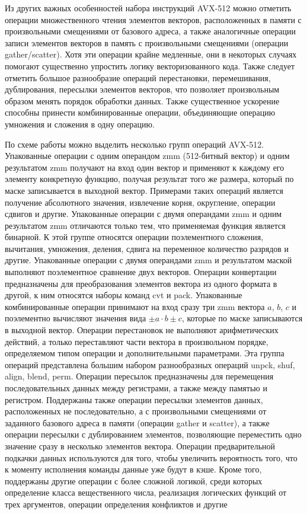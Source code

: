 Из других важных особенностей набора инструкций AVX-512 можно отметить операции множественного чтения элементов векторов, расположенных в памяти с произвольными смещениями от базового адреса, а также аналогичные операции записи элементов векторов в память с произвольными смещениями (операции gather/scatter).
Хотя эти операции крайне медленные, они в некоторых случаях помогают существенно упростить логику векторизованного кода.
Также следует отметить большое разнообразие операций перестановки, перемешивания, дублирования, пересылки элементов векторов, что позволяет произвольным образом менять порядок обработки данных.
Также существенное ускорение способны принести комбинированные операции, объединяющие операцию умножения и сложения в одну операцию.

По схеме работы можно выделить несколько групп операций AVX-512.
Упакованные операции с одним операндом zmm (512-битный вектор) и одним результатом zmm получают на вход один вектор и применяют к каждому его элементу конкретную функцию, получая результат того же размера, который по маске записывается в выходной вектор.
Примерами таких операций является получение абсолютного значения, извлечение корня, округление, операции сдвигов и другие.
Упакованные операции с двумя операндами zmm и одним результатом zmm отличаются только тем, что применяемая функция является бинарной.
К этой группе относятся операции поэлементного сложения, вычитания, умножения, деления, сдвига на переменное количество разрядов и другие.
Упакованные операции с двумя операндами zmm и результатом маской выполняют поэлементное сравнение двух векторов.
Операции конвертации предназначены для преобразования элементов вектора из одного формата в другой, к ним относятся наборы команд cvt и pack.
Упакованные комбинированные операции принимают на вход сразу три zmm вектора $a$, $b$, $c$ и поэлементно вычисляют значения вида $\pm a \cdot b \pm c$, которые по маске записываются в выходной вектор.
Операции перестановок не выполняют арифметических действий, а только переставляют части вектора в произвольном порядке, определяемом типом операции и дополнительными параметрами.
Эта группа операций представлена большим набором разнообразных операций unpck, shuf, align, blend, perm.
Операции пересылок предназначены для перемещения последовательных данных между регистрами, а также между памятью и регистром.
Поддержаны также операции пересылки элементов данных, расположенных не последовательно, а с произвольными смещениями от заданного базового адреса в памяти (операции gather и scatter), а также операции пересылки с дублированием элементов, позволяющие переместить одно значение сразу в несколько элементов вектора.
Операции предварительной подкачки данных используются для того, чтобы увеличить вероятность того, что к моменту исполнения команды данные уже будут в кэше.
Кроме того, поддержаны другие операции с более сложной логикой, среди которых определение класса вещественного числа, реализация логических функций от трех аргументов, операции определения конфликтов и другие

